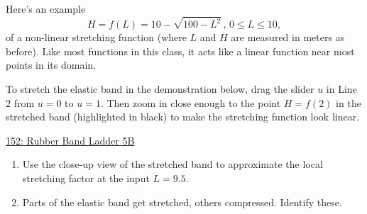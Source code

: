 \documentclass{ximera}
\begin{document}
\begin{example} \label{Ex:JDJFHDtet434t}
Here's an example
\[
      H = f(L) = 10 - \sqrt{100-L^2} \, , \, 0\leq L \leq 10,
\] 
of a non-linear stretching function (where $L$ and $H$ are measured in meters as before). Like most functions in this class, it acts like a linear function near most points in its domain. 

To stretch the elastic band in the demonstration below, drag the slider $u$ in Line 2 from $u=0$ to $u=1$. Then zoom in close enough to the point $H=f(2)$ in the stretched band (highlighted in black) to make the stretching function look linear. %


\begin{onlineOnly}
    \begin{center}
\end{center}
\end{onlineOnly}

\href{https://www.desmos.com/calculator/xk8dvcfgwi}{152: Rubber Band Ladder 5B}


\begin{enumerate}

\item Use the close-up view of the stretched band to approximate the local stretching factor at the input $L=9.5$.


\item Parts of the elastic band get stretched, others compressed. Identify these.
\end{enumerate}






\end{example}
\end{document}
